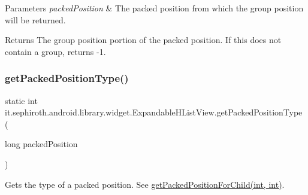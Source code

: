 \begin{DoxyParams}{Parameters}
{\em packed\+Position} & The packed position from which the group position will be returned. \\
\hline
\end{DoxyParams}
\begin{DoxyReturn}{Returns}
The group position portion of the packed position. If this does not contain a group, returns -\/1. 
\end{DoxyReturn}
\mbox{\label{classit_1_1sephiroth_1_1android_1_1library_1_1widget_1_1_expandable_h_list_view_ae574c6efbf83f1bb3d588c13a7bd0ef1}} 
\subsubsection{\texorpdfstring{get\+Packed\+Position\+Type()}{getPackedPositionType()}}
{\footnotesize\ttfamily static int it.\+sephiroth.\+android.\+library.\+widget.\+Expandable\+H\+List\+View.\+get\+Packed\+Position\+Type (\begin{DoxyParamCaption}\item[{long}]{packed\+Position }\end{DoxyParamCaption})\hspace{0.3cm}{\ttfamily [static]}}

Gets the type of a packed position. See \hyperlink{classit_1_1sephiroth_1_1android_1_1library_1_1widget_1_1_expandable_h_list_view_a37af0955cf4697ca1af59fbceff91fda}{get\+Packed\+Position\+For\+Child(int, int)}.


